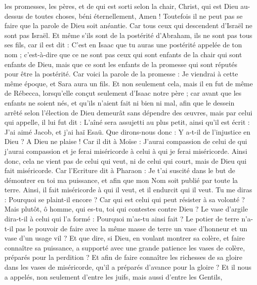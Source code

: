 \begin{multicols}{2}
les promesses, les pères, et de qui est sorti selon la chair, Christ, qui est Dieu au-dessus de toutes choses, béni éternellement, Amen !
Toutefois il ne peut pas se faire que la parole de Dieu soit anéantie. Car tous ceux qui descendent d'Israël ne sont pas Israël.
Et même s'ils sont de la postérité d'Abraham, ils ne sont pas tous ses fils, car il est dit : C'est en Isaac que tu auras une postérité appelée de ton nom ;
c'est-à-dire que ce ne sont pas ceux qui sont enfants de la chair qui sont enfants de Dieu, mais que ce sont les enfants de la promesse qui sont réputés pour être la postérité.
Car voici la parole de la promesse : Je viendrai à cette même époque, et Sara aura un fils.
Et non seulement cela, mais il en fut de même de Rébecca, lorsqu'elle conçut seulement d'Isaac notre père ;
car avant que les enfants ne soient nés, et qu'ils n'aient fait ni bien ni mal, afin que le dessein arrêté selon l'élection de Dieu demeurât sans dépendre des œuvres, mais par celui qui appelle, 
il lui fut dit : L'aîné sera assujetti au plus petit, ainsi qu'il est écrit :
J'ai aimé Jacob, et j'ai haï Esaü.
Que dirons-nous donc : Y a-t-il de l'injustice en Dieu ? A Dieu ne plaise !
Car il dit à Moïse : J'aurai compassion de celui de qui j'aurai compassion et je ferai miséricorde à celui à qui je ferai miséricorde.
Ainsi donc, cela ne vient pas de celui qui veut, ni de celui qui court, mais de Dieu qui fait miséricorde.
Car l'Ecriture dit à Pharaon : Je t'ai suscité dans le but de démontrer en toi ma puissance, et afin que mon Nom soit publié par toute la terre.
Ainsi, il fait miséricorde à qui il veut, et il endurcit qui il veut.
Tu me diras : Pourquoi se plaint-il encore ? Car qui est celui qui peut résister à sa volonté ?
Mais plutôt, ô homme, qui es-tu, toi qui contestes contre Dieu ? Le vase d'argile dira-t-il à celui qui l'a formé : Pourquoi m'as-tu ainsi fait ?
Le potier de terre n'a-t-il pas le pouvoir de faire avec la même masse de terre un vase d'honneur et un vase d'un usage vil ?
Et que dire, si Dieu, en voulant montrer sa colère, et faire connaître sa puissance, a supporté avec une grande patience les vases de colère, préparés pour la perdition ?
Et afin de faire connaître les richesses de sa gloire dans les vases de miséricorde, qu'il a préparés d'avance pour la gloire ?
Et il nous a appelés, non seulement d'entre les juifs, mais aussi d'entre les Gentils,

\end{multicols}
